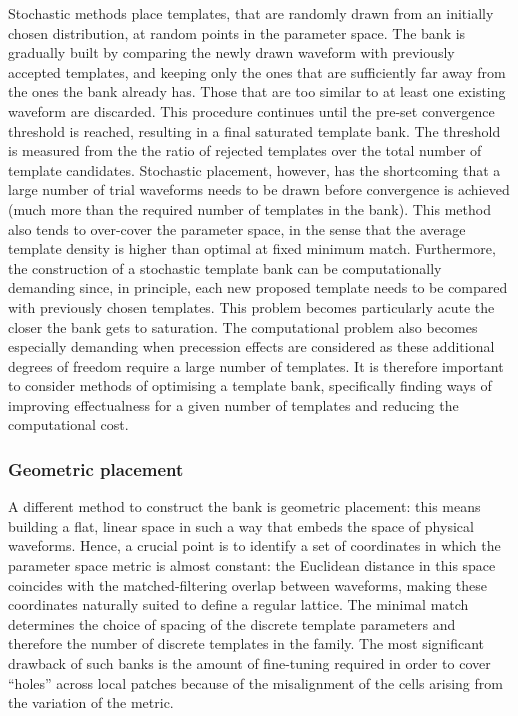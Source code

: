 \documentclass[binding=0.6cm, LaM]{sapthesis}
\begin{document}
	Stochastic methods place templates, 
	that are randomly drawn from an initially chosen distribution, 
	at random points in the parameter space.
	The bank is gradually built by comparing the newly drawn waveform
	with previously accepted templates, 
	and keeping only the ones that are sufficiently far away 
	from the ones the bank already has.
 	Those that are too similar to at least one existing waveform are discarded.
	This procedure continues until the pre-set convergence threshold is reached, 
	resulting in a final saturated template bank.
	The threshold is measured from the the ratio of rejected templates over the total number of template candidates.
	Stochastic placement, however, has the shortcoming that 
	a large number of trial waveforms needs to be drawn before convergence is achieved 
	(much more than the required number of templates in the bank). 
	This method also tends to over-cover the parameter space, 
	in the sense that the average template density is higher than optimal at fixed minimum match.
	Furthermore, the construction of a stochastic template bank 
	can be computationally demanding since, in principle, 
	each new proposed template needs to be compared 
	with previously chosen templates. 
	This problem becomes particularly acute 
	the closer the bank gets to saturation. 
	The computational problem also becomes especially demanding 
	when precession effects are considered as these additional degrees 
	of freedom require a large number of templates. 
	It is therefore important to consider methods of optimising a template bank, 
	specifically finding ways of improving effectualness for a given number 
	of templates and reducing the computational cost. 

\subsubsection{Geometric placement}


	A different method to construct the bank is geometric placement:
	this means building a flat, linear space in such a way that embeds the space of physical waveforms. 
	Hence, a crucial point is to identify a set of coordinates 
	in which the parameter space metric is almost constant: 
	the Euclidean distance in this space coincides with the matched-filtering overlap 
	between waveforms, making these coordinates naturally suited to define a regular lattice. 
	The minimal match determines the choice of spacing of the discrete template parameters 
	and therefore the number of discrete templates in the family.
	The most significant drawback of such banks is the amount of fine-tuning required 
	in order to cover “holes” across local patches because of the misalignment 
	of the cells arising from the variation of the metric. 
\end{document}
